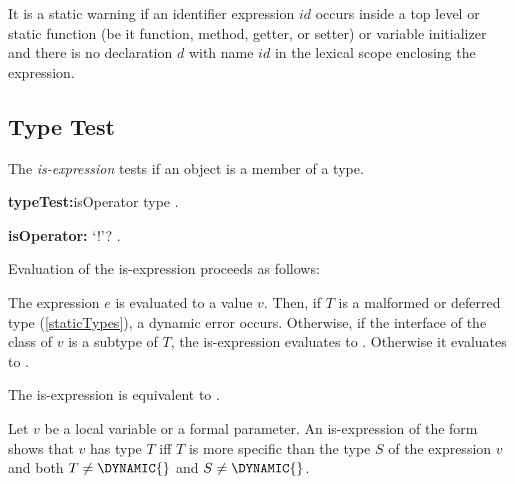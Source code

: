 \documentclass{article}
\begin{document}


\LMHash{}
It is a static warning if an identifier expression $id$ occurs inside a top level or static function (be it function, method, getter, or setter) or variable initializer and there is no declaration $d$ with name $id$ in the lexical scope enclosing the expression.


\subsection{Type Test}

\LMHash{}
The {\em is-expression} tests if an object is a member of a type.

\begin{grammar}
{\bf typeTest:}isOperator type
  .

{\bf isOperator:}\IS{} `!'?
  .
\end{grammar}

\LMHash{}
Evaluation of the is-expression  proceeds as follows:

\LMHash{}
The expression $e$ is evaluated to a value $v$.
Then, if $T$ is a malformed or deferred type (\ref{staticTypes}), a dynamic error occurs.
Otherwise, if the interface of the class of $v$ is a subtype of $T$, the is-expression evaluates to \TRUE.
Otherwise it evaluates to \FALSE.


\LMHash{}
The is-expression  is equivalent to .


\LMHash{}
Let $v$ be a local variable or a formal parameter.
An is-expression of the form  shows that $v$ has type $T$ if{}f $T$ is more specific than the type $S$ of the expression $v$ and both $T \ne \DYNAMIC{}$ and $S \ne \DYNAMIC{}$.
\end{document}
